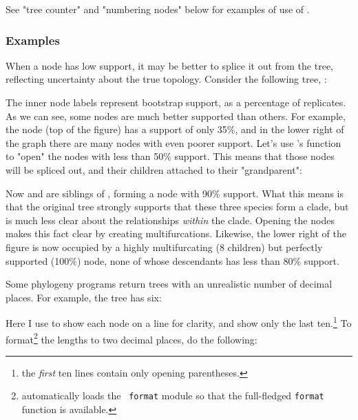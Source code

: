 See "tree counter" and "numbering nodes" below for examples of use of
.

\subsubsection{Examples}



When a node has low support, it may be better to splice it out from the tree,
reflecting uncertainty about the true topology. Consider the following tree, 
:


The inner node labels represent bootstrap support, as a percentage of
replicates. As we can see, some nodes are much better supported than others.
For example, the  node (top of the figure) has a support
of only 35\%, and in the lower right of the graph there are many nodes with even
poorer support. Let's use \luaed's  function to "open" the nodes with
less than 50\% support. This means that those nodes will be spliced out, and
their children attached to their "grandparent":


Now  and  are siblings of
, forming a node with 90\% support. What this means is that the
original tree strongly supports that these three species form a clade, but is
much less clear about the relationships {\em within} the clade. Opening the
nodes makes this fact clear by creating multifurcations. Likewise, the lower
right of the figure is now occupied by a highly multifurcating (8 children) but
perfectly supported (100\%) node, none of whose descendants has less than 80\%
support.



Some phylogeny programs return \nw{} trees with an unrealistic number
of decimal places. For example, the  tree has six:


Here I use \nwindent{} to show each node on a line for clarity, and
show only the last ten.\footnote{the {\em first} ten lines contain only
opening parentheses.} To format\footnote{\sched{} automatically loads the {\tt
format} module so that the full-fledged {\tt format} function is available.}
the lengths to two decimal places, do the following:

